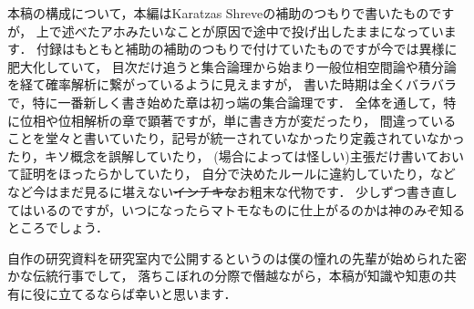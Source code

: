 本稿の構成について，本編はKaratzas Shreveの補助のつもりで書いたものですが，
上で述べたアホみたいなことが原因で途中で投げ出したままになっています．
付録はもともと補助の補助のつもりで付けていたものですが今では異様に肥大化していて，
目次だけ追うと集合論理から始まり一般位相空間論や積分論を経て確率解析に繋がっているように見えますが，
書いた時期は全くバラバラで，特に一番新しく書き始めた章は初っ端の集合論理です．
全体を通して，特に位相や位相解析の章で顕著ですが，単に書き方が変だったり，
間違っていることを堂々と書いていたり，記号が統一されていなかったり定義されていなかったり，キソ概念を誤解していたり，
(場合によっては怪しい)主張だけ書いておいて証明をほったらかしていたり，
自分で決めたルールに違約していたり，などなど今はまだ見るに堪えない\sout{インチキな}お粗末な代物です．
少しずつ書き直してはいるのですが，いつになったらマトモなものに仕上がるのかは神のみぞ知るところでしょう．

自作の研究資料を研究室内で公開するというのは僕の憧れの先輩が始められた密かな伝統行事でして，
落ちこぼれの分際で僭越ながら，本稿が知識や知恵の共有に役に立てるならば幸いと思います．
\\
\\
